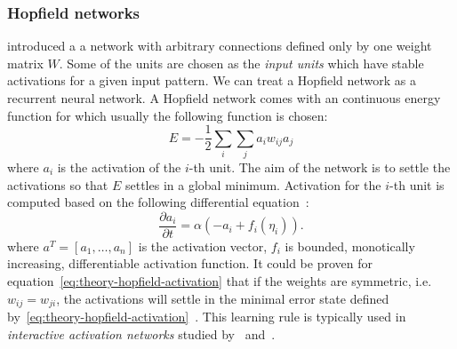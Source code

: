 \subsubsection{Hopfield networks}
\label{sec:theory-hopfield}

\citet{hopfield1984neurons} introduced a a network with arbitrary connections defined only by one weight matrix $W$. Some of the units are chosen as the \emph{input units} which have stable activations for a given input pattern. We can treat a Hopfield network as a recurrent neural network. A Hopfield network comes with an continuous energy function for which usually the following function is chosen: 
\begin{equation}
  \label{eq:theory-hopfield-energy}
  E = -\frac{1}{2}\sum_i\sum_ja_iw_{ij}a_j
\end{equation} 
where $a_i$ is the activation of the $i$-th unit. The aim of the network is to settle the activations so that $E$ settles in a global minimum. Activation for the $i$-th unit is computed based on the following differential equation~\citep{hopfield1984neurons}: 
\begin{equation}
  \label{eq:theory-hopfield-activation}
  \frac{\partial a_i}{\partial t} = \alpha(-a_i + f_i(\eta_i)).
\end{equation} 
where $a^T = [a_1,\ldots,a_n]$ is the activation vector, $f_i$ is bounded, monotically increasing, differentiable activation function. It could be proven for equation~\ref{eq:theory-hopfield-activation} that if the weights are symmetric, i.e. $w_{ij} = w_{ji}$, the activations will settle in the minimal error state defined by~\ref{eq:theory-hopfield-activation}~\citep{hopfield1984neurons}. This learning rule is typically used in \emph{interactive activation networks} studied by~\citet{grossberg1978theory} and~\citet{mcclelland1981interactive}. 

